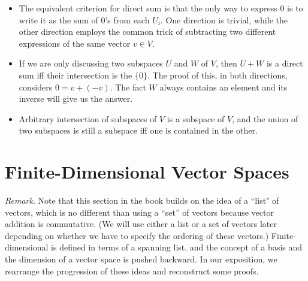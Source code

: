 \documentclass{article}
\begin{document}
\begin{itemize}
    \item The equivalent criterion for direct sum is that the only way to express $0$ is to write it as the sum of $0$'s from each $U_i$. One direction is trivial, while the other direction employs the common trick of subtracting two different expressions of the same vector $v \in V$.
    \item If we are only discussing two subspaces $U$ and $W$ of $V$, then $U+W$ is a direct sum iff their intersection is the $\{0\}$. The proof of this, in both directions, considers $0 = v + (-v)$. The fact $W$ always contains an element and its inverse will give us the answer.
    \item Arbitrary intersection of subspaces of $V$ is a subspace of $V$, and the union of two subspaces is still a subspace iff one is contained in the other.
\end{itemize}

\section{Finite-Dimensional Vector Spaces}

\textit{Remark}. Note that this section in the book builds on the idea of a ``list" of vectors, which is no different than using a ``set'' of vectors because vector addition is commutative. (We will use either a list or a set of vectors later depending on whether we have to specify the ordering of these vectors.) Finite-dimensional is defined in terms of a spanning list, and the concept of a basis and the dimension of a vector space is pushed backward. In our exposition, we rearrange the progression of these ideas and reconstruct some proofs.
\end{document}
